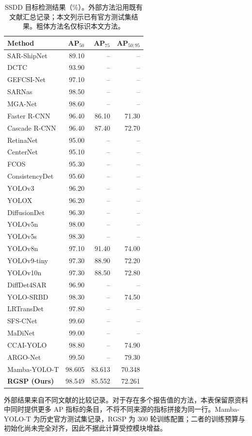 \documentclass[journal]{IEEEtran}
\begin{document}
\begin{table}[!t]
\centering
\small
\setlength{\tabcolsep}{5pt}
\caption{SSDD 目标检测结果（\%）。外部方法沿用既有文献汇总记录；本文列示已有官方测试集结果。粗体方法名仅标识本文方法。}
\label{tab:ssdd_comparison}
\begin{tabular*}{\textwidth}{@{\extracolsep{\fill}}lrrr}
\toprule
Method & AP$_{50}$ & AP$_{75}$ & AP$_{50:95}$ \\
\midrule
SAR-ShipNet    & 89.10 & -- & -- \\
DCTC           & 93.90 & -- & -- \\
GEFCSI-Net     & 97.10 & -- & -- \\
SARNas         & 98.50 & -- & -- \\
MGA-Net        & 98.60 & -- & -- \\
Faster R-CNN   & 96.40 & 86.10 & 71.30 \\
Cascade R-CNN  & 96.40 & 87.40 & 72.70 \\
RetinaNet      & 95.00 & -- & -- \\
CenterNet      & 95.10 & -- & -- \\
FCOS           & 95.30 & -- & -- \\
ConsistencyDet & 95.60 & -- & -- \\
YOLOv3         & 96.20 & -- & -- \\
YOLOX          & 96.20 & -- & -- \\
DiffusionDet   & 96.30 & -- & -- \\
YOLOv5n        & 98.00 & -- & -- \\
YOLOv5s        & 98.30 & -- & -- \\
YOLOv8n        & 97.10 & 91.40 & 74.00 \\
YOLOv9-tiny    & 97.30 & 88.90 & 72.20 \\
YOLOv10n       & 97.30 & 88.50 & 72.80 \\
DiffDet4SAR    & 96.90 & -- & -- \\
YOLO-SRBD      & 98.30 & -- & 74.50 \\
LRTransDet     & 97.80 & -- & -- \\
SFS-CNet       & 99.60 & -- & -- \\
MaDiNet        & 99.00 & -- & -- \\
CCAI-YOLO      & 98.80 & -- & 74.90 \\
ARGO-Net       & 99.50 & -- & 79.30 \\
\midrule
Mamba-YOLO-T   & 98.605 & 83.613 & 70.348 \\
\textbf{RGSP (Ours)}
               & 98.549 & 85.552 & 72.261 \\
\bottomrule
\end{tabular*}
\smallskip
\begin{minipage}{\linewidth}
\footnotesize
外部结果来自不同文献的比较记录。对于存在多个报告值的方法，本表保留原资料中同时提供更多 AP 指标的条目，不将不同来源的指标拼接为同一行。Mamba-YOLO-T 为历史官方测试集记录，RGSP 为 300 轮训练配置；二者的训练预算与初始化尚未完全对齐，因此不据此计算受控模块增益。
\end{minipage}
\end{table}
\end{document}
